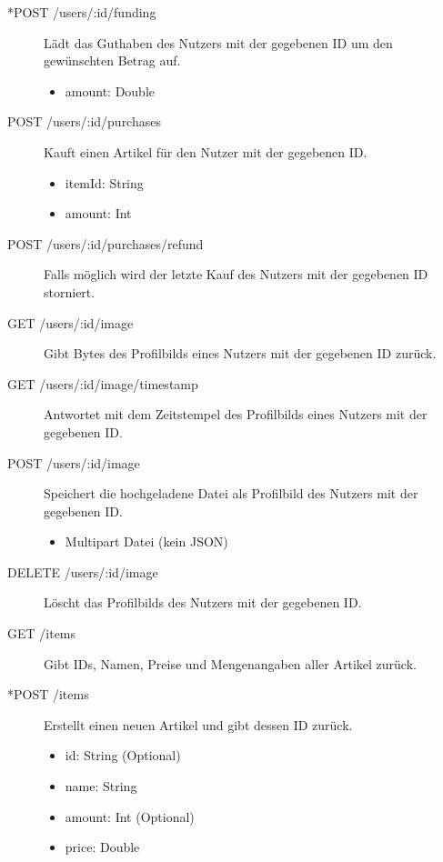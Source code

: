 \begin{appendix}
\begin{description}
	\item[*POST /users/:id/funding] Lädt das Guthaben des Nutzers mit der gegebenen ID um den gewünschten Betrag auf.
	\begin{itemize}
		\item amount: Double
	\end{itemize}

	\item[POST /users/:id/purchases] Kauft einen Artikel für den Nutzer mit der gegebenen ID.
	\begin{itemize}
		\item itemId: String
		\item amount: Int
	\end{itemize}

	\item[POST /users/:id/purchases/refund] Falls möglich wird der letzte Kauf des Nutzers mit der gegebenen ID storniert.
	
	\item[GET /users/:id/image] Gibt Bytes des Profilbilds eines Nutzers mit der gegebenen ID zurück.
	
	\item[GET /users/:id/image/timestamp] Antwortet mit dem Zeitstempel des Profilbilds eines Nutzers mit der gegebenen ID.
	
	\item[POST /users/:id/image] Speichert die hochgeladene Datei als Profilbild des Nutzers mit der gegebenen ID.
	\begin{itemize}
		\item Multipart Datei (kein JSON)
	\end{itemize}

	\item[DELETE /users/:id/image] Löscht das Profilbilds des Nutzers mit der gegebenen ID.
	
	
	\item[GET /items] Gibt IDs, Namen, Preise und Mengenangaben aller Artikel zurück.

	\item[*POST /items] Erstellt einen neuen Artikel und gibt dessen ID zurück.
	\begin{itemize}
		\item id: String (Optional)
		\item name: String
		\item amount: Int (Optional)
		\item price: Double
	\end{itemize}
	

\end{description}
\end{appendix}
